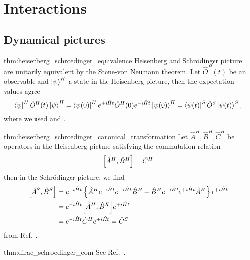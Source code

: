 \section{Interactions}

\subsection{Dynamical pictures}

\begin{delayedproof}{thm:heisenberg_schroedinger_equivalence}
	Heisenberg and Schrödinger picture are unitarily equivalent by the Stone-von Neumann theorem.
	Let $\hat{O}^H(t)$ be an observable and $\ket{\psi}^H$ a state in the Heisenberg picture, then the expectation values agree
	\begin{equation}
		\bra{\psi}^H
		\hat{O}^H(t)
		\ket{\psi}^H
		=
		\bra{\psi(0)}^H
		e^{+i\hat{H}t}
		\hat{O}^H(0)
		e^{-i\hat{H}t}
		\ket{\psi(0)}^H
		=
		\bra{\psi(t)}^S
		\hat{O}^S
		\ket{\psi(t)}^S
		,
	\end{equation}
	where we used  and .
\end{delayedproof}

\begin{delayedproof}{thm:heisenberg_schroedinger_canonical_transformation}
	Let $\hat{A}^H,\hat{B}^H,\hat{C}^H$ be operators in the Heisenberg picture satisfying the commutation relation
	\begin{equation}
		\comm{\hat{A}^H}{\hat{B}^H}
		=
		\hat{C}^H
	\end{equation}
	then in the Schrödinger picture, we find
	\begin{equation}
		\begin{split}
			\comm{\hat{A}^S}{\hat{B}^S}
			&=
			e^{-i\hat{H}t}
			\left\{
				\hat{A}^H
				e^{+i\hat{H}t}
				e^{-i\hat{H}t}
				\hat{B}^H
				-	
				\hat{B}^H
				e^{-i\hat{H}t}
				e^{+i\hat{H}t}
				\hat{A}^H
			\right\}
			e^{+i\hat{H}t}
			\\
			&=
			e^{-i\hat{H}t}
			\comm{\hat{A}^H}{\hat{B}^H}
			e^{+i\hat{H}t}
			\\
			&=
			e^{-i\hat{H}t}
			\hat{C}^H
			e^{+i\hat{H}t}
			=
			\hat{C}^S
		\end{split}
	\end{equation}
	from Ref.~\cite[p.~213]{Greiner2013}.
\end{delayedproof}

\begin{delayedproof}{thm:dirac_schroedinger_eom}
	See Ref.~\cite[p.~214]{Greiner2013}.
\end{delayedproof}

